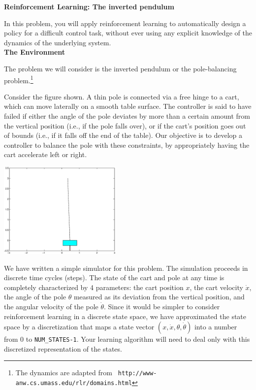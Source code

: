 \item {} {\bf Reinforcement Learning: The inverted pendulum}

In this problem, you will apply reinforcement learning to automatically
design a policy for a difficult control task, without ever using any 
explicit knowledge of the dynamics of the underlying system.\\

\textbf{The Environment}

The problem we will consider is the inverted pendulum or the pole-balancing 
problem.\footnote{The dynamics are adapted from {\tt
    http://www-anw.cs.umass.edu/rlr/domains.html}}

Consider the figure shown. A thin pole is connected via a free hinge to a cart, 
which can move laterally on a smooth table surface. The controller is said to 
have failed if either the angle of the pole deviates by more than a certain
amount from the vertical position (i.e., if the pole falls over), or if the
cart's position goes out of bounds (i.e., if it falls off the end of the table).
Our objective is to develop a controller to balance the pole with these 
constraints, by appropriately having the cart accelerate left or right.


\begin{center}
  \includegraphics[width=6cm]{cartpole/cart_pole.eps}
\end{center}

We have written a simple simulator for this problem. The simulation 
proceeds in discrete time cycles (steps). The state of the cart and pole at any time 
is completely characterized by 4 parameters: the cart position $x$, the 
cart velocity $\dot{x}$, the angle of the pole $\theta$ measured as its deviation 
from the vertical position, and the angular velocity of the pole $\dot{\theta}$.  
Since it would be simpler to
consider reinforcement learning in a discrete state space,
we have approximated the state space by a discretization that maps 
a state vector $(x,\dot{x}, \theta, \dot{\theta})$ into a number
from 0 to {\tt NUM\_STATES-1}. Your learning algorithm will need to 
deal only with this discretized representation of the states.

